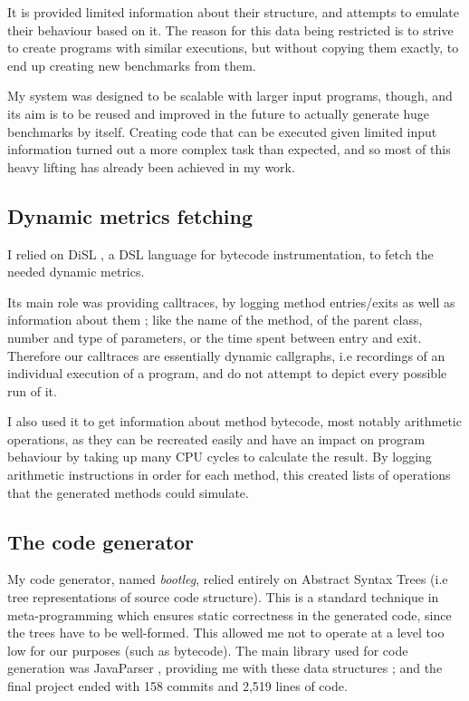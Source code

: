 \documentclass[12pt]{article}
\begin{document}
It is provided limited information about their structure, and attempts to emulate their behaviour based on it. The reason for this data being restricted is to strive to create programs with similar executions, but without copying them exactly, to end up creating new benchmarks from them.

My system was designed to be scalable with larger input programs, though, and its aim is to be reused and improved in the future to actually generate huge benchmarks by itself. Creating code that can be executed given limited input information turned out a more complex task than expected, and so most of this heavy lifting has already been achieved in my work.


\subsection{Dynamic metrics fetching}
I relied on DiSL \cite{disl}, a DSL language for bytecode instrumentation, to fetch the needed dynamic metrics.

Its main role was providing calltraces, by logging method entries/exits as well as information about them ; like the name of the method, of the parent class, number and type of parameters, or the time spent between entry and exit. Therefore our calltraces are essentially dynamic callgraphs, i.e recordings of an individual execution of a program, and do not attempt to depict every possible run of it. 

I also used it to get information about method bytecode, most notably arithmetic operations, as they can be recreated easily and have an impact on program behaviour by taking up many CPU cycles to calculate the result. By logging arithmetic instructions in order for each method, this created lists of operations that the generated methods could simulate.

\subsection{The code generator}
\label{section:code_generator}
My code generator, named \textit{bootleg}, relied entirely on Abstract Syntax Trees (i.e tree representations of source code structure). This is a standard technique in meta-programming \cite{program-generators} which ensures static correctness in the generated code, since the trees have to be well-formed. This allowed me not to operate at a level too low for our purposes (such as bytecode). The main library used for code generation was JavaParser \cite{javaparser}, providing me with these data structures ; and the final project ended with 158 commits and 2,519 lines of code. 
\end{document}
